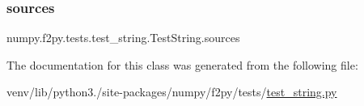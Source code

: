\subsubsection{\texorpdfstring{sources}{sources}}
{\footnotesize\ttfamily numpy.\+f2py.\+tests.\+test\+\_\+string.\+Test\+String.\+sources\hspace{0.3cm}{\ttfamily [static]}}



The documentation for this class was generated from the following file\+:\begin{DoxyCompactItemize}
\item 
venv/lib/python3./site-\/packages/numpy/f2py/tests/\hyperlink{test__string_8py}{test\+\_\+string.\+py}\end{DoxyCompactItemize}
